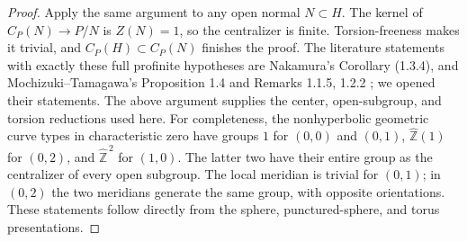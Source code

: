 \begin{proof}
Apply the same argument to any open normal $N\subset H$. The kernel of
$C_P(N)\to P/N$ is $Z(N)=1$, so the centralizer is finite. Torsion-freeness
makes it trivial, and $C_P(H)\subset C_P(N)$ finishes the proof.
The literature statements with exactly these full profinite hypotheses
are Nakamura's Corollary (1.3.4)\cite{AB_Nakamura1994}, and
Mochizuki--Tamagawa's Proposition 1.4 and Remarks 1.1.5, 1.2.2
\cite{AB_MochizukiTamagawa2008}; we opened their statements. The above
argument supplies the center, open-subgroup, and torsion reductions used
here.
For completeness, the nonhyperbolic geometric curve types in characteristic
zero have groups $1$ for $(0,0)$ and $(0,1)$,
$\widehat{\mathbb Z}(1)$ for $(0,2)$, and
$\widehat{\mathbb Z}^{\,2}$ for $(1,0)$. The latter two have their entire
group as the centralizer of every open subgroup. The local meridian is
trivial for $(0,1)$; in $(0,2)$ the two meridians generate the same group,
with opposite orientations. These statements follow directly from the
sphere, punctured-sphere, and torus presentations.
\end{proof}

